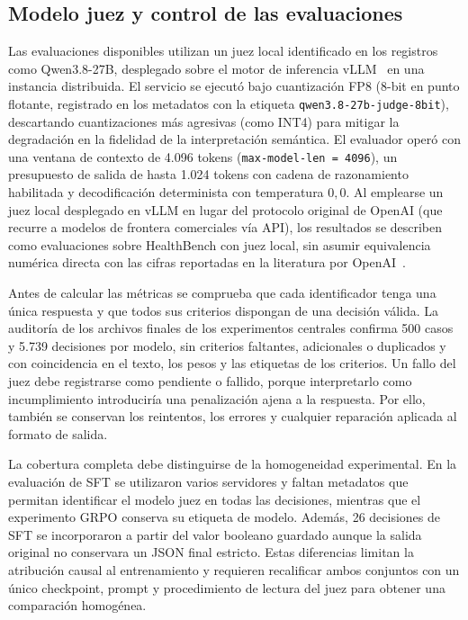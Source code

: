 \subsection{Modelo juez y control de las evaluaciones}
Las evaluaciones disponibles utilizan un juez local identificado en los registros como Qwen3.8-27B, desplegado sobre el motor de inferencia vLLM~\cite{kwon2023vllm} en una instancia distribuida. El servicio se ejecutó bajo cuantización FP8 (8-bit en punto flotante, registrado en los metadatos con la etiqueta \texttt{qwen3.8-27b-judge-8bit}), descartando cuantizaciones más agresivas (como INT4) para mitigar la degradación en la fidelidad de la interpretación semántica. El evaluador operó con una ventana de contexto de 4.096 tokens (\texttt{max-model-len = 4096}), un presupuesto de salida de hasta 1.024 tokens con cadena de razonamiento habilitada y decodificación determinista con temperatura $0{,}0$. Al emplearse un juez local desplegado en vLLM en lugar del protocolo original de OpenAI (que recurre a modelos de frontera comerciales vía API), los resultados se describen como evaluaciones sobre HealthBench con juez local, sin asumir equivalencia numérica directa con las cifras reportadas en la literatura por OpenAI~\cite{arora2025healthbench}.

Antes de calcular las métricas se comprueba que cada identificador tenga una única respuesta y que todos sus criterios dispongan de una decisión válida. La auditoría de los archivos finales de los experimentos centrales confirma 500 casos y 5.739 decisiones por modelo, sin criterios faltantes, adicionales o duplicados y con coincidencia en el texto, los pesos y las etiquetas de los criterios. Un fallo del juez debe registrarse como pendiente o fallido, porque interpretarlo como incumplimiento introduciría una penalización ajena a la respuesta. Por ello, también se conservan los reintentos, los errores y cualquier reparación aplicada al formato de salida.

La cobertura completa debe distinguirse de la homogeneidad experimental. En la evaluación de SFT se utilizaron varios servidores y faltan metadatos que permitan identificar el modelo juez en todas las decisiones, mientras que el experimento GRPO conserva su etiqueta de modelo. Además, 26 decisiones de SFT se incorporaron a partir del valor booleano guardado aunque la salida original no conservara un JSON final estricto. Estas diferencias limitan la atribución causal al entrenamiento y requieren recalificar ambos conjuntos con un único checkpoint, prompt y procedimiento de lectura del juez para obtener una comparación homogénea.


